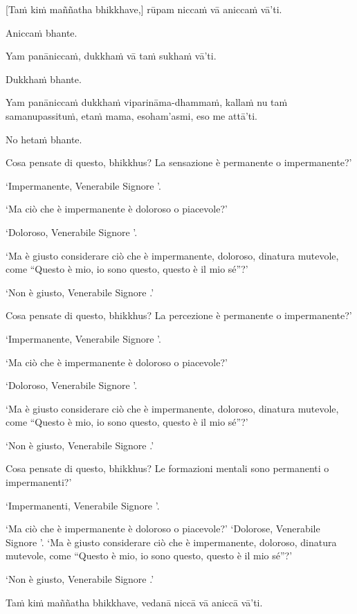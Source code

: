 [Taṁ kiṁ maññatha bhikkhave,] rūpam niccaṁ vā aniccaṁ vā'ti.

Aniccaṁ bhante.

Yam panāniccaṁ, dukkhaṁ vā taṁ sukhaṁ vā'ti.

Dukkhaṁ bhante.

Yam panāniccaṁ dukkhaṁ viparināma-dhammaṁ, kallaṁ nu taṁ samanupassituṁ,
etaṁ mama, esoham'asmi, eso me attā'ti.

No hetaṁ bhante.

\clearpage

\englishText
\markboth{\englishTitle}{\rightmark}

Cosa pensate di questo, bhikkhus? La sensazione è permanente o
impermanente?’


‘Impermanente, Venerabile Signore ’.

‘Ma ciò che è impermanente è doloroso o piacevole?’ 

‘Doloroso, Venerabile Signore ’.

‘Ma è giusto considerare ciò che è impermanente, doloroso, dinatura mutevole, come
“Questo è mio, io sono questo, questo è il mio sé”?’

‘Non è giusto, Venerabile Signore .’

Cosa pensate di questo, bhikkhus? La percezione è permanente o
impermanente?’

‘Impermanente, Venerabile Signore ’.

‘Ma ciò che è impermanente è doloroso o piacevole?’

‘Doloroso, Venerabile Signore ’.


‘Ma è giusto considerare ciò che è impermanente, doloroso, dinatura mutevole, come
“Questo è mio, io sono questo, questo è il mio sé”?’

‘Non è giusto, Venerabile Signore .’

Cosa pensate di questo, bhikkhus? Le formazioni mentali sono permanenti o
impermanenti?’

‘Impermanenti, Venerabile Signore ’.

‘Ma ciò che è impermanente è doloroso o piacevole?’ 
‘Dolorose, Venerabile Signore ’.
‘Ma è giusto considerare ciò che è impermanente, doloroso, dinatura mutevole, come
“Questo è mio, io sono questo, questo è il mio sé”?’

‘Non è giusto, Venerabile Signore .’

\clearpage

\paliText
\markboth{\paliTitle}{\rightmark}

Taṁ kiṁ maññatha bhikkhave, vedanā niccā vā aniccā vā'ti.

